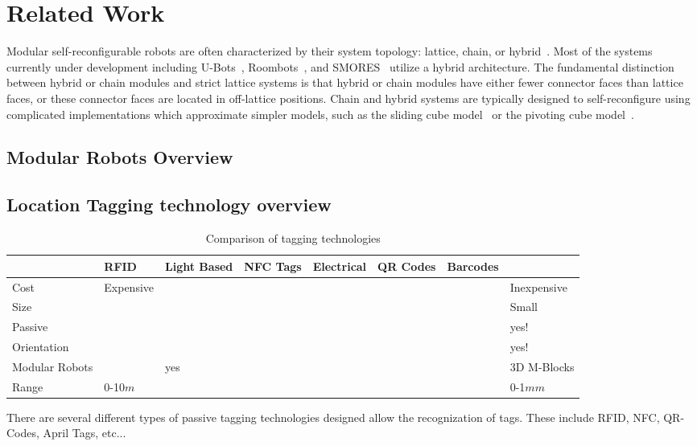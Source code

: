 \section{Related Work}
\label{sec:RelatedWork}

Modular self-reconfigurable robots are often characterized by their
system topology: lattice, chain, or hybrid~\cite{Yim-RAM07}.  Most of
the systems currently under development including U-Bots~\cite{ubot},
Roombots~\cite{roombots3}, and SMORES~\cite{Yim-RAM07} utilize a hybrid
architecture. The fundamental distinction between hybrid or chain modules and
strict lattice systems is that hybrid or chain modules have either fewer
connector faces than lattice faces, or these connector faces are
located in off-lattice positions.  Chain and hybrid
systems are typically designed to self-reconfigure using complicated
implementations which approximate simpler models, such as the sliding cube model~\cite{FitchRus-IROS03} or
the pivoting cube model~\cite{RomanishinRus-IROS13}.

\subsection{Modular Robots Overview}

\subsection{Location Tagging technology overview}

\begin{table*}[ht]
	\centering
	\caption{Comparison of tagging technologies}
	
	\begin{tabular}{ |p{1.3cm}|p{1.6cm}|p{1.6cm}|p{1.6cm}|p{1.6cm}|p{1.6cm}|p{1.6cm}|p{1.6cm}|  }
		\hline
		& RFID 				%
		& Light Based		%
		& NFC Tags 			%
		& Electrical 		%
		& QR Codes 			%
		& Barcodes			%
		& \tagNamePlural \\ 	%
		\hline
		Cost			& Expensive	& 		& 		& 		& 		& 	  	& Inexpensive \\
		Size 			&  			& 		&    	&   	&       &     	& Small		  \\
		Passive 		&  			&		&  		&	 	&		& 		& yes!		  \\
		Orientation 	&  			& 		&  		&	 	&	  	& 		& yes!		\\
		Modular Robots 	&  			& yes	&	  	&		&		& 		& 3D M-Blocks\\
		Range			& 0-10$m$	&		&		&		&		&		& 0-1$mm$	\\
	\end{tabular}
	\label{tab:tagTech}    
\end{table*}

There are several different types of passive tagging technologies designed allow the recognization of tags. These include RFID, NFC, QR-Codes, April Tags, etc... 


